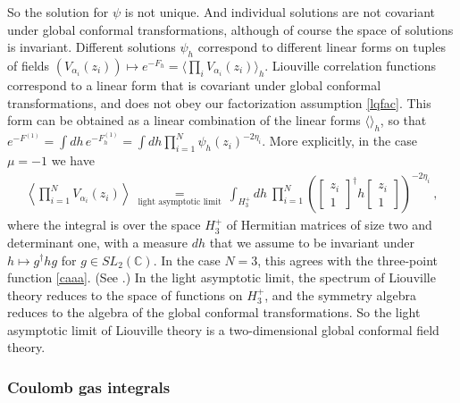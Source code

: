 \documentclass[12pt, a4paper, notitlepage, twoside]{report}
\numberwithin{equation}{section}
\theoremstyle{break}
\begin{document}
So the solution for $\psi$ is not unique. And individual solutions are not covariant under global conformal transformations, although of course the space of solutions is invariant.
Different solutions $\psi_h$ correspond to different linear forms on tuples of fields $(V_{\alpha_i}(z_i)) \mapsto e^{-F_h} = \langle \prod_i V_{\alpha_i}(z_i)\rangle_h$. 
Liouville correlation functions correspond to a linear form that is covariant under global conformal transformations, and does not  obey our factorization assumption \eqref{lqfac}. 
This form can be obtained as a linear combination of the linear forms $\langle \rangle_h$, so that $e^{-F^{(1)}} = \int dh\, e^{-F^{(1)}_h} = \int dh \prod_{i=1}^N \psi_h(z_i)^{-2\eta_i}$. 
More explicitly, in the case $\mu=-1$ we have
\begin{align}
\left\langle\prod_{i=1}^N V_{\alpha_i}(z_i)\right\rangle\ \underset{\text{light\ asymptotic\ limit}}{=}\ \int_{H^+_3} dh\ \prod_{i=1}^N \left( \left[\begin{smallmatrix} z_i \\ 1 \end{smallmatrix}\right]^\dagger h \left[\begin{smallmatrix} z_i \\ 1 \end{smallmatrix}\right] \right)^{-2\eta_i}\ ,
\label{zih}
\end{align}
where the integral is over the space \textbf{\boldmath $H_3^+$} of Hermitian matrices of size two and determinant one, with a measure $dh$ that we assume to be invariant under $h\mapsto g^\dagger hg$ for $g\in SL_2({\mathbb{C}})$.
In the case $N=3$, this agrees with the three-point function \eqref{caaa}. (See \cite{zz95}.) In the light asymptotic limit, the spectrum of Liouville theory reduces to the space of functions on $H_3^+$, and the symmetry algebra reduces to the algebra of the global conformal transformations.
So
the light asymptotic limit of Liouville theory is a two-dimensional global conformal field theory.

\subsubsection{Coulomb gas integrals}
\end{document}
